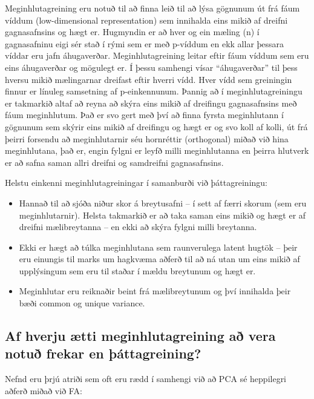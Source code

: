 \documentclass[]{book}
\begin{document}
Meginhlutagreining eru notuð til að finna leið til að lýsa gögnunum út frá fáum víddum (low-dimensional representation) sem innihalda eins mikið af dreifni gagnasafnsins og hægt er. Hugmyndin er að hver og ein mæling (n) í gagnasafninu eigi sér stað í rými sem er með p-víddum en ekk allar þessara víddar eru jafn áhugaverðar. Meginhlutagreining leitar eftir fáum víddum sem eru eins áhugaverðar og mögulegt er. Í þessu samhengi vísar ``áhugaverðar'' til þess hversu mikið mælingarnar dreifast eftir hverri vídd. Hver vídd sem greiningin finnur er línuleg samsetning af p-einkennunum. Þannig að í meginhlutagreiningu er takmarkið altaf að reyna að skýra eins mikið af dreifingu gagnasafnsins með fáum meginhlutum. Það er svo gert með því að finna fyrsta meginhlutann í gögnunum sem skýrir eins mikið af dreifingu og hægt er og svo koll af kolli, út frá þeirri forsendu að meginhlutarnir séu hornréttir (orthogonal) miðað við hina meginhlutana, það er, engin fylgni er leyfð milli meginhlutanna en þeirra hlutverk er að safna saman allri dreifni og samdreifni gagnasafnsins.

Helstu einkenni meginhlutagreiningar í samanburði við þáttagreiningu:

\begin{itemize}
\item
  Hannað til að sjóða niður skor á breytusafni -- í sett af færri skorum (sem eru meginhlutarnir). Helsta takmarkið er að taka saman eins mikið og hægt er af dreifni mælibreytanna -- en ekki að skýra fylgni milli breytanna.
\item
  Ekki er hægt að túlka meginhlutana sem raunverulega latent hugtök -- þeir eru einungis til marks um hagkvæma aðferð til að ná utan um eins mikið af upplýsingum sem eru til staðar í mældu breytunum og hægt er.
\item
  Meginhlutar eru reiknaðir beint frá mælibreytunum og því innihalda þeir bæði common og unique variance.
\end{itemize}

\hypertarget{af-hverju-uxe6tti-meginhlutagreining-auxf0-vera-notuuxf0-frekar-en-uxfeuxe1ttagreining}{%
\subsection{Af hverju ætti meginhlutagreining að vera notuð frekar en þáttagreining?}\label{af-hverju-uxe6tti-meginhlutagreining-auxf0-vera-notuuxf0-frekar-en-uxfeuxe1ttagreining}}

Nefnd eru þrjú atriði sem oft eru rædd í samhengi við að PCA sé heppilegri aðferð miðað við FA:
\end{document}
